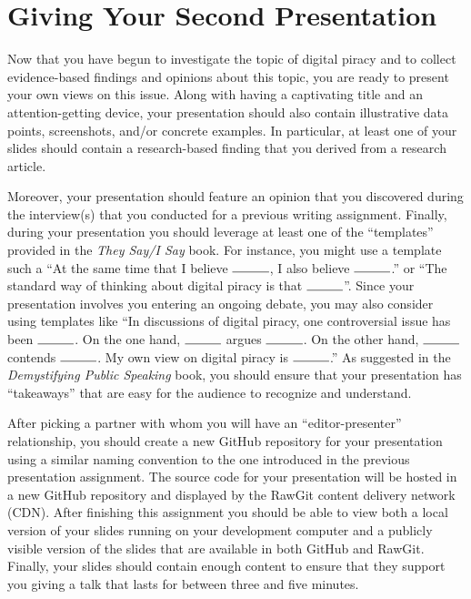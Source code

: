 

\usepackage[compact]{titlesec}




\vspace*{-.2in}
\section*{Giving Your Second Presentation}

Now that you have begun to investigate the topic of digital piracy and to collect evidence-based findings and opinions
about this topic, you are ready to present your own views on this issue. Along with having a captivating title and an
attention-getting device, your presentation should also contain illustrative data points, screenshots, and/or concrete
examples. In particular, at least one of your slides should contain a research-based finding that you derived from a
research article.

Moreover, your presentation should feature an opinion that you discovered during the interview(s) that you conducted for
a previous writing assignment. Finally, during your presentation you should leverage at least one of the ``templates''
provided in the {\em They Say/I Say} book. For instance, you might use a template such a ``At the same time that I
believe $\rule{1cm}{0.15mm}$, I also believe $\rule{1cm}{0.15mm}$.'' or ``The standard way of thinking about digital
piracy is that $\rule{1cm}{0.15mm}$''. Since your presentation involves you entering an ongoing debate, you may also
consider using templates like ``In discussions of digital piracy, one controversial issue has been $\rule{1cm}{0.15mm}$.
On the one hand, $\rule{1cm}{0.15mm}$ argues $\rule{1cm}{0.15mm}$. On the other hand, $\rule{1cm}{0.15mm}$ contends
$\rule{1cm}{0.15mm}$. My own view on digital piracy is $\rule{1cm}{0.15mm}$.'' As suggested in the {\em Demystifying
Public Speaking} book, you should ensure that your presentation has ``takeaways'' that are easy for the audience to
recognize and understand.

After picking a partner with whom you will have an ``editor-presenter'' relationship, you should create a new GitHub
repository for your presentation using a similar naming convention to the one introduced in the previous presentation
assignment. The source code for your presentation will be hosted in a new GitHub repository and displayed by the RawGit
content delivery network (CDN). After finishing this assignment you should be able to view both a local version of your
slides running on your development computer and a publicly visible version of the slides that are available in both
GitHub and RawGit. Finally, your slides should contain enough content to ensure that they support you giving a talk that
lasts for between three and five minutes.

